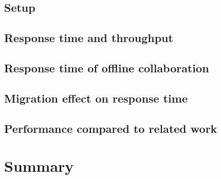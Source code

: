 \section{Setup}
\label{sec:experimental-setup}


\section{Response time and throughput}
\label{sec:eval1}


\section{Response time of offline collaboration}
\label{sec:eval2}


\section{Migration effect on response time}
\label{sec:eval3}


\section{Performance compared to related work}
\label{sec:eval4}


\chapter{Summary}

